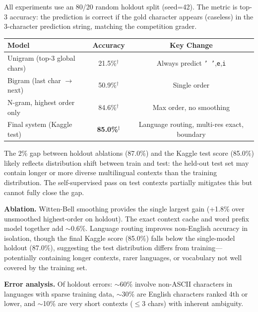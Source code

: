 \documentclass[11pt]{article}
\begin{document}
All experiments use an 80/20 random holdout split (seed=42). The metric is top-3 accuracy: the prediction is correct if the gold character appears (caseless) in the 3-character prediction string, matching the competition grader.

\begin{table}[h]
\centering
\small
\begin{tabular}{lcc}
\toprule
\textbf{Model} & \textbf{Accuracy} & \textbf{Key Change} \\
\midrule
Unigram (top-3 global chars) & 21.5\%$^\dagger$ & Always predict \texttt{' '},\texttt{e},\texttt{i} \\
Bigram (last char $\to$ next) & 50.9\%$^\dagger$ & Single order \\
N-gram, highest order only & 84.6\%$^\dagger$ & Max order, no smoothing \\
Final system (Kaggle test) & \textbf{85.0\%}$^\ddagger$ & Language routing, multi-res exact, boundary \\
\bottomrule
\end{tabular}
\end{table}


\vspace{2pt}
\noindent The 2\% gap between holdout ablations (87.0\%) and the Kaggle test score (85.0\%) likely reflects distribution shift between train and test: the held-out test set may contain longer or more diverse multilingual contexts than the training distribution. The self-supervised pass on test contexts partially mitigates this but cannot fully close the gap.

\textbf{Ablation.}
Witten-Bell smoothing provides the single largest gain (+1.8\% over unsmoothed highest-order on holdout). The exact context cache and word prefix model together add ${\sim}$0.6\%. Language routing improves non-English accuracy in isolation, though the final Kaggle score (85.0\%) falls below the single-model holdout (87.0\%), suggesting the test distribution differs from training---potentially containing longer contexts, rarer languages, or vocabulary not well covered by the training set.

\textbf{Error analysis.}
Of holdout errors: ${\sim}$60\% involve non-ASCII characters in languages with sparse training data, ${\sim}$30\% are English characters ranked 4th or lower, and ${\sim}$10\% are very short contexts ($\leq$3 chars) with inherent ambiguity.
\end{document}
